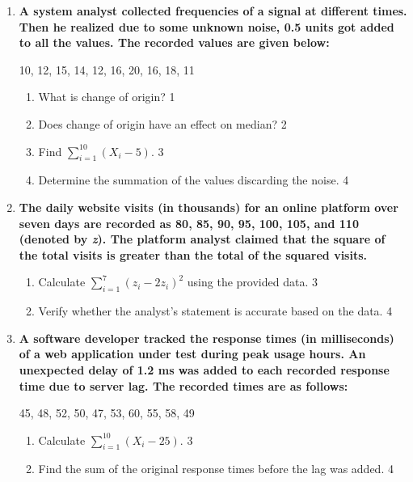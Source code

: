 \documentclass[a4paper,oneside]{book}
\begin{document}
\begin{enumerate}

     \item
	  \textbf{A system analyst collected frequencies of a signal at different times. Then he realized due to some unknown noise, 0.5 units got added to all the values. The recorded values are given below:} 
	  
	  \begin{center}
	  10, 12, 15, 14, 12, 16, 20, 16, 18, 11
	  \end{center}
  
  \begin{enumerate}
    \item
	What is change of origin? \hfill 1
    \item
	Does change of origin have an effect on median? \hfill 2
    \item  
	Find $\displaystyle \sum_{i=1}^{10} (X_i-5)$. \hfill 3
    \item
	Determine the summation of the values discarding the noise. \hfill 4
  \end{enumerate}
  
  \item  
\textbf{The daily website visits (in thousands) for an online platform over seven days are recorded as 80, 85, 90, 95, 100, 105, and 110 (denoted by \textit{z}). The platform analyst claimed that the square of the total visits is greater than the total of the squared visits.}

\begin{enumerate}
    \item  
    Calculate $\displaystyle \sum_{i=1}^7 (z_i - 2z_i)^2$ using the provided data. \hfill 3
    \item
    Verify whether the analyst’s statement is accurate based on the data. \hfill 4
\end{enumerate}
  
  \item
\textbf{A software developer tracked the response times (in milliseconds) 
of a web application under test during peak usage hours. An unexpected 
delay of 1.2 ms was added to each recorded response time due to server
lag. The recorded times are as follows:}

\begin{center}
45, 48, 52, 50, 47, 53, 60, 55, 58, 49
\end{center}

\begin{enumerate}
    \item  
    Calculate $\displaystyle \sum_{i=1}^{10} (X_i - 25)$. \hfill 3
    \item
    Find the sum of the original response times before the lag was added. \hfill 4
\end{enumerate}


\end{enumerate}
\end{document}
